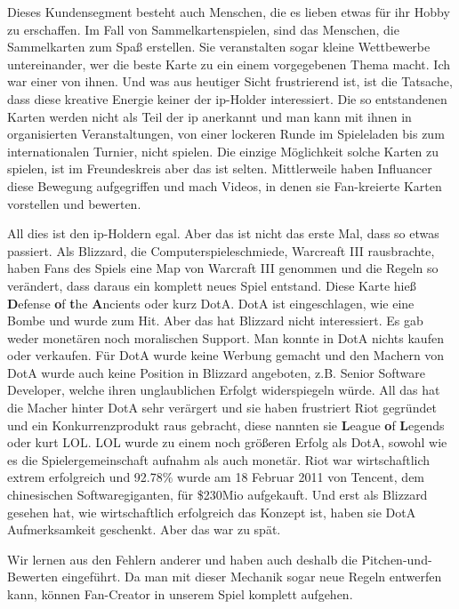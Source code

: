 \documentclass[fontsize=12, a4aper]{scrartcl}
\begin{document}
Dieses Kundensegment besteht auch Menschen, die es lieben etwas für ihr Hobby zu erschaffen. Im Fall von Sammelkartenspielen, sind das Menschen, die Sammelkarten zum Spaß erstellen. Sie veranstalten sogar kleine Wettbewerbe untereinander, wer die beste Karte zu ein einem vorgegebenen Thema macht. Ich war einer von ihnen. Und was aus heutiger Sicht frustrierend ist, ist die Tatsache, dass diese kreative Energie keiner der \ac{ip}-Holder interessiert. Die so entstandenen Karten werden nicht als Teil der \ac{ip} anerkannt und man kann mit ihnen in organisierten Veranstaltungen, von einer lockeren Runde im Spieleladen bis zum internationalen Turnier, nicht spielen. Die einzige Möglichkeit solche Karten zu spielen, ist im Freundeskreis aber das ist selten. Mittlerweile haben Influancer diese Bewegung aufgegriffen und mach Videos, in denen sie Fan-kreierte Karten vorstellen und bewerten.\hfill\newline

\noindent All dies ist den \ac{ip}-Holdern egal. Aber das ist nicht das erste Mal, dass so etwas passiert. Als Blizzard, die Computerspieleschmiede, Warcreaft III rausbrachte, haben Fans des Spiels eine Map von Warcraft III genommen und die Regeln so verändert, dass daraus ein komplett neues Spiel entstand. Diese Karte hieß \glqq \textbf{D}efense \textbf{o}f \textbf{t}he \textbf{A}ncients\grqq{} oder kurz DotA. DotA ist eingeschlagen, wie eine Bombe und wurde zum Hit. Aber das hat Blizzard nicht interessiert. Es gab weder monetären noch moralischen Support. Man konnte in DotA nichts kaufen oder verkaufen. Für DotA wurde keine Werbung gemacht und den Machern von DotA wurde auch keine Position in Blizzard angeboten, z.B. Senior Software Developer, welche ihren unglaublichen Erfolgt widerspiegeln würde. All das hat die Macher hinter DotA sehr verärgert und sie haben frustriert Riot gegründet und ein Konkurrenzprodukt raus gebracht, diese nannten sie \glqq \textbf{L}eague \textbf{o}f \textbf{L}egends\grqq{} oder kurt LOL. LOL wurde zu einem noch größeren Erfolg als DotA, sowohl wie es die Spielergemeinschaft aufnahm als auch monetär. Riot war wirtschaftlich extrem erfolgreich und 92.78\% wurde am 18 Februar 2011 von Tencent, dem chinesischen Softwaregiganten, für \$230Mio aufgekauft. Und erst als Blizzard gesehen hat, wie wirtschaftlich erfolgreich das Konzept ist, haben sie DotA Aufmerksamkeit geschenkt. Aber das war zu spät.\hfill\newline

\noindent Wir lernen aus den Fehlern anderer und haben auch deshalb die Pitchen-und-Bewerten eingeführt. Da man mit dieser Mechanik sogar neue Regeln entwerfen kann, können Fan-Creator in unserem Spiel komplett aufgehen.\hfill\newline
\end{document}
